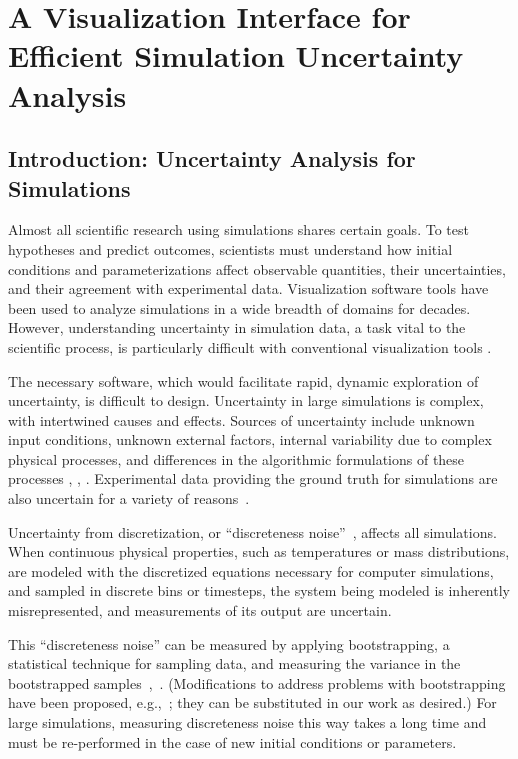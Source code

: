 \chapter{A Visualization Interface for Efficient Simulation Uncertainty Analysis}
\section{Introduction: Uncertainty Analysis for Simulations}
Almost all scientific research using simulations shares certain goals. To test hypotheses and predict outcomes, scientists must understand how initial conditions and parameterizations affect observable quantities, their uncertainties, and their agreement with experimental data. Visualization software tools have been used to analyze simulations in a wide breadth of domains for decades. However, understanding uncertainty in simulation data, a task vital to the scientific process, is particularly difficult with conventional visualization tools \cite{bonneau}.

The necessary software, which would facilitate rapid, dynamic exploration of uncertainty, is difficult to design. Uncertainty in large simulations is complex, with intertwined causes and effects. Sources of uncertainty include unknown input conditions, unknown external factors, internal variability due to complex physical processes, and differences in the algorithmic formulations of these processes \cite{Deser2012}, \cite{georgakakos}, \cite{haroz:2008}. Experimental data providing the ground truth for simulations are also uncertain for a variety of reasons~\cite{gleckler}.

Uncertainty from discretization, or ``discreteness noise''~\cite{rau}, affects all simulations. When continuous physical properties, such as temperatures or mass distributions, are modeled with the discretized equations necessary for computer simulations, and sampled in discrete bins or timesteps, the system being modeled is inherently misrepresented, and measurements of its output are uncertain. 


This ``discreteness noise'' can be measured by applying bootstrapping, a statistical technique for sampling data, and measuring the variance in the bootstrapped samples~\cite{rau},~\cite{vavrus}. (Modifications to address problems with bootstrapping have been proposed, e.g.,~\cite{Steck}; they can be substituted in our work as desired.) For large simulations, measuring discreteness noise this way takes a long time and must be re-performed in the case of new initial conditions or parameters. 


